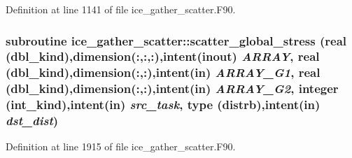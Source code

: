 Definition at line 1141 of file ice\_\-gather\_\-scatter.F90.\hypertarget{namespaceice__gather__scatter_a484f45410ad7c18c07379d8bd0400caf}{
\subsubsection[{scatter\_\-global\_\-stress}]{\setlength{\rightskip}{0pt plus 5cm}subroutine ice\_\-gather\_\-scatter::scatter\_\-global\_\-stress (real (dbl\_\-kind),dimension(:,:,:),intent(inout) {\em ARRAY}, \/  real (dbl\_\-kind),dimension(:,:),intent(in) {\em ARRAY\_\-G1}, \/  real (dbl\_\-kind),dimension(:,:),intent(in) {\em ARRAY\_\-G2}, \/  integer (int\_\-kind),intent(in) {\em src\_\-task}, \/  type (distrb),intent(in) {\em dst\_\-dist})}}
\label{namespaceice__gather__scatter_a484f45410ad7c18c07379d8bd0400caf}


Definition at line 1915 of file ice\_\-gather\_\-scatter.F90.